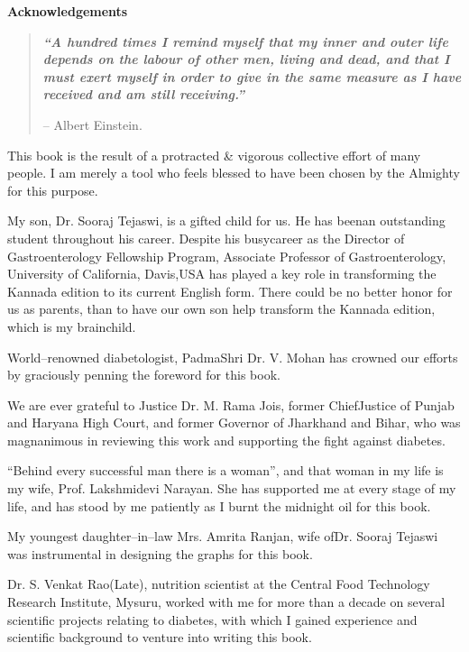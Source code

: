 \thispagestyle{empty}

\begin{center}
\Huge\textbf{Acknowledgements}
\end{center}

\vskip 20pt

\begin{quote}
\textbf{\textit{“A hundred times I remind myself that my inner and outer life depends on the labour of other men, living and dead, and that I must exert myself in order to give in the same measure as I have received and am still receiving.”}}
\begin{flushright}
– Albert Einstein.
\end{flushright}
\end{quote}

This book is the result of a protracted \& vigorous collective effort of many people. I am merely a tool who feels blessed to have been chosen by the Almighty for this purpose.

My son, Dr. Sooraj Tejaswi, is a gifted child for us. He has been\break an outstanding student throughout his career. Despite his busy\break career as the Director of Gastroenterology Fellowship Program, Asso\-ciate Professor of Gastroenterology, University of California, Davis,\break USA has played a key role in transforming the Kannada edition to its current English form. There could be no better honor for us as parents, than to have our own son help transform the Kannada edition, which is my brainchild.

World–renowned diabetologist, PadmaShri Dr. V. Mohan has crow\-ned our efforts by graciously penning the foreword for this book.

We are ever grateful to Justice Dr. M. Rama Jois, former Chief\break Justice of Punjab and Haryana High Court, and former Governor of Jharkhand and Bihar, who was magnanimous in reviewing this work and supporting the fight against diabetes.

 “Behind every successful man there is a woman”, and that woman in my life is my wife, Prof. Lakshmidevi Narayan. She has supported me at every stage of my life, and has stood by me patiently as I burnt the midnight oil for this book.

My youngest daughter–in–law Mrs. Amrita Ranjan, wife of\break Dr. Sooraj Tejaswi was instrumental in designing the graphs for this book.

Dr. S. Venkat Rao(Late), nutrition scientist at the Central Food Technology Research Institute, Mysuru, worked with me for more than a decade on several scientific projects relating to diabetes, with which I gained experience and scientific background to venture into writing this book.

